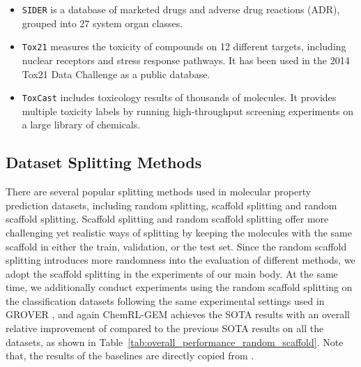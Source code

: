 \documentclass{article}
\begin{document}
\begin{itemize}
    \item \texttt{SIDER} \cite{DBLP:journals/nar/KuhnLJB16} is a database of marketed drugs and adverse drug reactions (ADR), grouped into 27 system organ classes.
    \item \texttt{Tox21} \cite{huang2017editorial} measures the toxicity of compounds on 12 different targets, including nuclear receptors and stress response pathways. It has been used in the 2014 Tox21 Data Challenge as a public database. 
    \item \texttt{ToxCast} \cite{richard2016toxcast} includes toxicology results of thousands of molecules. It provides multiple toxicity labels by running high-throughput screening experiments on a large library of chemicals.
\end{itemize}


\subsection{Dataset Splitting Methods} 

There are several popular splitting methods used in molecular property prediction datasets, including random splitting, scaffold splitting \cite{bemis1996properties} and random scaffold splitting. Scaffold splitting and random scaffold splitting offer more challenging yet realistic ways of splitting by keeping the molecules with the same scaffold in either the train, validation, or the test set. Since the random scaffold splitting introduces more randomness into the evaluation of different methods, we adopt the scaffold splitting in the experiments of our main body. At the same time, we additionally conduct experiments using the random scaffold splitting on the classification datasets following the same experimental settings used in GROVER \cite{DBLP:conf/nips/RongBXX0HH20}, and again ChemRL-GEM achieves the SOTA results with an overall relative improvement of  compared to the previous SOTA results on all the datasets, as shown in Table~\ref{tab:overall_performance_random_scaffold}. Note that, the results of the baselines are directly copied from \cite{DBLP:conf/nips/RongBXX0HH20}.
\end{document}
